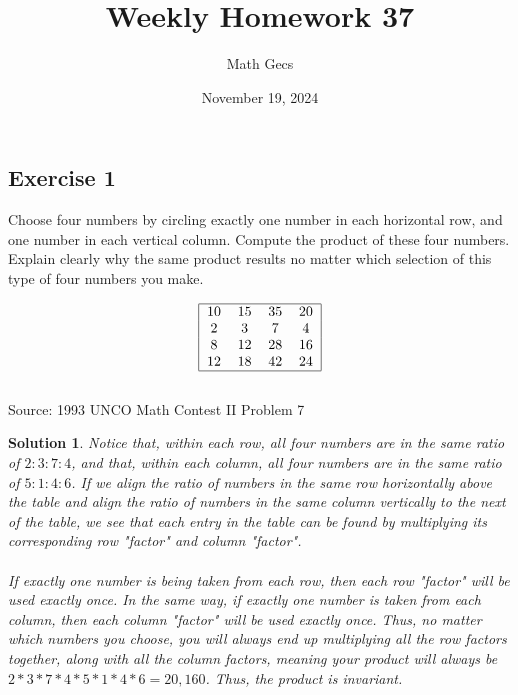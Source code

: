 \documentclass[12pt]{article}
\title{Weekly Homework 37}
\author{Math Gecs}
\date{November 19, 2024}
\newtheorem*{solution*}{Solution}
\begin{document}
\maketitle

\subsection*{Exercise 1}
Choose four numbers by circling exactly one number in each horizontal row, and one number in each vertical column. Compute the product of these four numbers. Explain clearly why the same product results no matter which selection of this type of four numbers you make.

\[\begin{tabular}{|cccc|} \hline 10 & 15 & 35 & 20 \\ 2& 3& 7& 4\\ 8& 12& 28& 16\\ 12& 18& 42& 24\\ \hline \end{tabular}\]\\

Source: 1993 UNCO Math Contest II Problem 7\\


\begin{solution*}
Notice that, within each row, all four numbers are in the same ratio of $2:3:7:4$, and that, within each column, all four numbers are in the same ratio of $5:1:4:6$. If we align the ratio of numbers in the same row horizontally above the table and align the ratio of numbers in the same column vertically to the next of the table, we see that each entry in the table can be found by multiplying its corresponding row "factor" and column "factor".
\\ \\
If exactly one number is being taken from each row, then each row "factor" will be used exactly once. In the same way, if exactly one number is taken from each column, then each column "factor" will be used exactly once. Thus, no matter which numbers you choose, you will always end up multiplying all the row factors together, along with all the column factors, meaning your product will always be $2 * 3 * 7 * 4 * 5 * 1 * 4 * 6 = 20,160$. Thus, the product is invariant.
\end{solution*}
\end{document}

